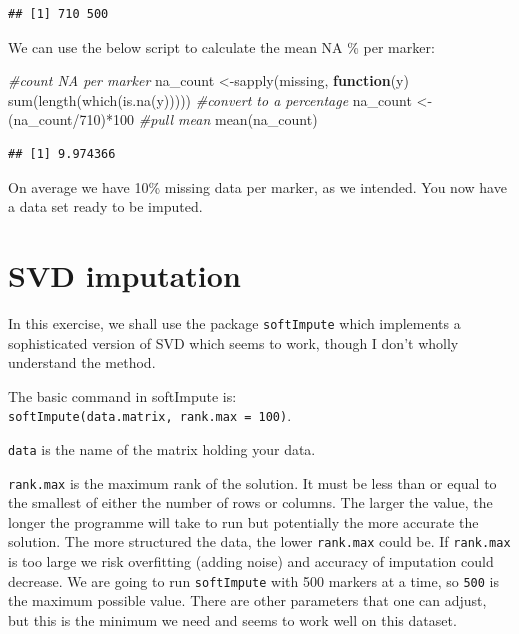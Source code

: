 \documentclass[
]{book}
\newenvironment{Shaded}{\begin{snugshade}}{\end{snugshade}}
\newcommand{\CommentTok}[1]{\textcolor[rgb]{0.56,0.35,0.01}{\textit{#1}}}
\newcommand{\ControlFlowTok}[1]{\textcolor[rgb]{0.13,0.29,0.53}{\textbf{#1}}}
\newcommand{\DecValTok}[1]{\textcolor[rgb]{0.00,0.00,0.81}{#1}}
\newcommand{\FunctionTok}[1]{\textcolor[rgb]{0.00,0.00,0.00}{#1}}
\newcommand{\NormalTok}[1]{#1}
\newcommand{\OtherTok}[1]{\textcolor[rgb]{0.56,0.35,0.01}{#1}}
\newcommand{\SpecialCharTok}[1]{\textcolor[rgb]{0.00,0.00,0.00}{#1}}
\begin{document}
\begin{verbatim}
## [1] 710 500
\end{verbatim}

We can use the below script to calculate the mean NA \% per marker:

\begin{Shaded}
\begin{Highlighting}[]
\CommentTok{\#count NA per marker}
\NormalTok{na\_count }\OtherTok{\textless{}{-}}\FunctionTok{sapply}\NormalTok{(missing, }\ControlFlowTok{function}\NormalTok{(y) }\FunctionTok{sum}\NormalTok{(}\FunctionTok{length}\NormalTok{(}\FunctionTok{which}\NormalTok{(}\FunctionTok{is.na}\NormalTok{(y)))))}
\CommentTok{\#convert to a percentage}
\NormalTok{na\_count }\OtherTok{\textless{}{-}}\NormalTok{(na\_count}\SpecialCharTok{/}\DecValTok{710}\NormalTok{)}\SpecialCharTok{*}\DecValTok{100}
\CommentTok{\#pull mean}
\FunctionTok{mean}\NormalTok{(na\_count)}
\end{Highlighting}
\end{Shaded}

\begin{verbatim}
## [1] 9.974366
\end{verbatim}

On average we have 10\% missing data per marker, as we intended. You now have a data set ready to be imputed.

\hypertarget{svd-imputation}{%
\section{SVD imputation}\label{svd-imputation}}

In this exercise, we shall use the package \texttt{softImpute} which implements a sophisticated version of SVD which seems to work, though I don't wholly understand the method.

The basic command in softImpute is: \texttt{softImpute(data.matrix,\ rank.max\ =\ 100)}.

\texttt{data} is the name of the matrix holding your data.

\texttt{rank.max} is the maximum rank of the solution. It must be less than or equal to the smallest of either the number of rows or columns. The larger the value, the longer the programme will take to run but potentially the more accurate the solution. The more structured the data, the lower \texttt{rank.max} could be. If \texttt{rank.max} is too large we risk overfitting (adding noise) and accuracy of imputation could decrease. We are going to run \texttt{softImpute} with 500 markers at a time, so \texttt{500} is the maximum possible value. There are other parameters that one can adjust, but this is the minimum we need and seems to work well on this dataset.
\end{document}
